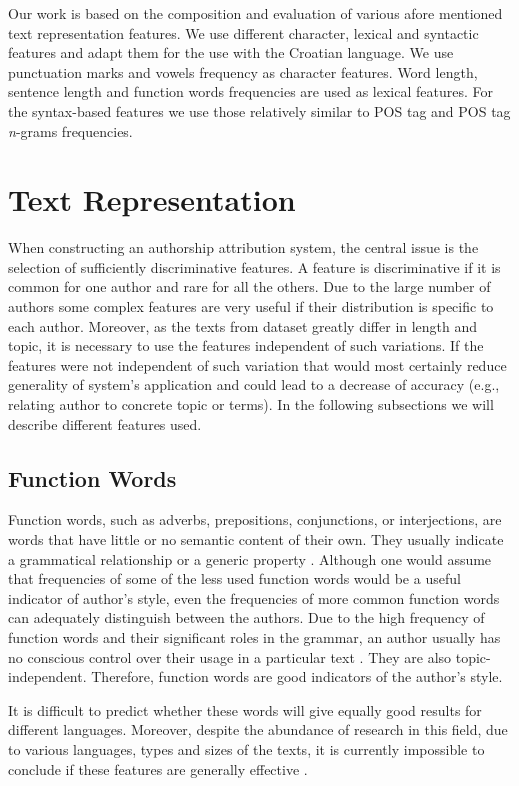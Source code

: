 \documentclass{llncs}
\begin{document}
Our work is based on the composition and evaluation of various afore mentioned
text representation features. We use different character, lexical and syntactic
features and adapt them for the use with the Croatian language. We use
punctuation marks and vowels frequency as character features. Word length,
sentence length and function words frequencies are used as lexical features. For
the syntax-based features we use those relatively similar to POS tag and POS tag
\emph{n}-grams frequencies.


\section{Text Representation}
When constructing an authorship attribution system, the central issue is the
selection of sufficiently discriminative features. A feature is discriminative if
it is common for one author and rare for all the others. Due to the large number
of authors some complex features are very useful if their distribution is
specific to each author. Moreover, as the texts from dataset greatly differ in
length and topic, it is necessary to use the features independent of such
variations. If the features were not independent of such variation that
would most certainly reduce generality of system's application and could lead
to a decrease of accuracy (e.g., relating author to concrete topic or terms). In the following subsections we will describe different features used.

\subsection{Function Words}
\label{sec:funkcijske-rijeci}
Function words, such as adverbs, prepositions, conjunctions, or interjections,
are words that have little or no semantic content of their own. They usually
indicate a grammatical relationship or a generic property
\cite{zhao2005effective}. Although one would assume that frequencies of some of
the less used function words would be a useful indicator of author's style, even the
frequencies of more common function words can adequately distinguish between the
authors. Due to the high frequency of function words and their significant
roles in the grammar, an author usually has no conscious control over their
usage in a particular text \cite{argamon2005measuring}. They are also
topic-independent. Therefore, function words are good indicators of the author's
style.

It is difficult to predict whether these words will give equally good results for
different languages. Moreover, despite the abundance of research in this field,
due to various languages, types and sizes of the texts, it is currently
impossible to conclude if these features are generally effective
\cite{zhao2005effective}.
\end{document}

